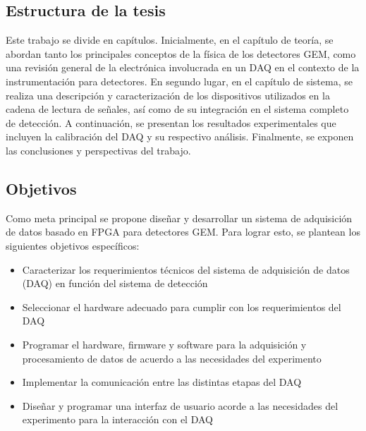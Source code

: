 \documentclass[]{book}
\begin{document}



\subsection{Estructura de la tesis}

\noindent Este trabajo se divide en capítulos. Inicialmente, en el capítulo de teoría, se abordan tanto los principales conceptos de la física de los detectores GEM, como una revisión general de la electrónica involucrada en un DAQ en el contexto de la instrumentación para detectores. En segundo lugar, en el capítulo de sistema, se realiza una descripción y caracterización de los dispositivos utilizados en la cadena de lectura de señales, así como de su integración en el sistema completo de detección. A continuación, se presentan los resultados experimentales que incluyen la calibración del DAQ y su respectivo análisis. Finalmente, se exponen las conclusiones y perspectivas del trabajo.

\subsection{Objetivos}
\noindent Como meta principal se propone diseñar y desarrollar un sistema de adquisición de datos basado en FPGA para detectores GEM. Para lograr esto, se plantean los siguientes objetivos específicos:

\begin{itemize}
    \item Caracterizar los requerimientos técnicos del sistema de adquisición de datos (DAQ) en función del sistema de detección
    \item Seleccionar el hardware adecuado para cumplir con los requerimientos del DAQ
    \item Programar el hardware, firmware y software para la adquisición y procesamiento de datos de acuerdo a las necesidades del experimento 
    \item Implementar la comunicación entre las distintas etapas del DAQ 
    \item Diseñar y programar una interfaz de usuario acorde a las necesidades del experimento para la interacción con el DAQ
    
\end{itemize}
\end{document}
